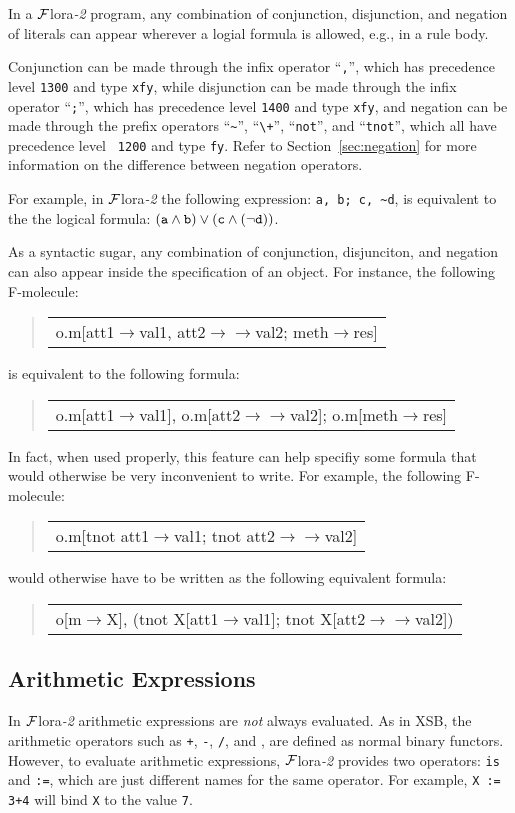 \documentclass[11pt]{article}
\newenvironment{qrules}{\begin{quote}\sf\begin{tabular}[t]{l}}%
{\end{tabular}\end{quote}}
\newcommand{\fd}{\ensuremath{{\rightarrow}}}                   %
\newcommand{\mvd}{\ensuremath{{\rightarrow\!\!\!\!\rightarrow}}}  %
\newcommand{\FLORA}{{\mbox{${\cal F}${\sc lora}\rm\emph{-2}}}\xspace}
\begin{document}
%
In a \FLORA program, any combination of conjunction, disjunction, and
negation of literals can appear wherever a logial formula is allowed,
e.g., in a rule body.

Conjunction can be made through the infix operator ``{\tt ,}'', which
has precedence level {\tt 1300} and type {\tt xfy}, while disjunction
can be made through the infix operator ``{\tt ;}'', which has
precedence level {\tt 1400} and type {\tt xfy}, and negation can be
made through the prefix operators ``{\verb|~|}'', ``{\verb|\+|}'',
``{\tt not}'', and ``{\tt tnot}'', which all have precedence level {\tt
1200} and type {\tt fy}. Refer to Section~\ref{sec:negation} for more
information on the difference between negation operators.

For example, in \FLORA the following expression: \verb|a, b; c, ~d|,
is equivalent to the the logical formula:
$\tt (a \wedge b) \vee (c \wedge (\neg d))$.

%
As a syntactic sugar, any combination of conjunction, disjunciton, and
negation can also appear inside the specification of an object. For
instance, the following F-molecule:
\begin{qrules}
o.m[att1{\fd}val1, att2{\mvd}val2; meth{\fd}res]
\end{qrules}
is equivalent to the following formula:
\begin{qrules}
o.m[att1{\fd}val1], o.m[att2{\mvd}val2]; o.m[meth{\fd}res]
\end{qrules}

In fact, when used properly, this feature can help specifiy some
formula that would otherwise be very inconvenient to write. For example,
the following F-molecule:
\begin{qrules}
o.m[tnot att1{\fd}val1; tnot att2{\mvd}val2]
\end{qrules}
would otherwise have to be written as the following equivalent formula:
\begin{qrules}
o[m{\fd}X], (tnot X[att1{\fd}val1]; tnot X[att2{\mvd}val2])
\end{qrules}


\subsection{Arithmetic Expressions}


In \FLORA arithmetic expressions are \emph{not} always evaluated. As
in XSB, the arithmetic operators such as {\tt +}, {\tt -}, {\tt /},
and {\tt *}, are defined as normal binary functors. However, to
evaluate arithmetic expressions, \FLORA provides two operators:
{\tt is} and {\tt :=}, which are just different names for the same
operator. For example, {\tt X := 3+4} will bind {\tt X} to the value
{\tt 7}.
\end{document}

